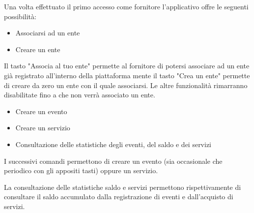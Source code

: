 \begin{center}
\end{center}
Una volta effettuato il primo accesso come fornitore l'applicativo offre le seguenti possibilità:
\begin{itemize}
    \item Associarsi ad un ente
    \item Creare un ente
\end{itemize}
\begin{center}
\end{center}
Il tasto "Associa al tuo ente" permette al fornitore di potersi associare ad un ente già registrato all'interno della piattaforma mente il tasto "Crea un ente" permette di creare da zero un ente con il quale associarsi. Le altre funzionalità rimarranno disabilitate fino a che non verrà associato un ente.
\begin{itemize}
    \item Creare un evento
    \item Creare un servizio
    \item Consultazione delle statistiche degli eventi, del saldo e dei servizi
\end{itemize}
\begin{center}
\end{center}
\begin{center}
\end{center}
I successivi comandi permettono di creare un evento (sia occasionale che periodico con gli appositi tasti) oppure un servizio.
\begin{center}
\end{center}
La consultazione delle statistiche saldo e servizi permettono rispettivamente di consultare il saldo accumulato dalla registrazione di eventi e dall'acquisto di servizi.



